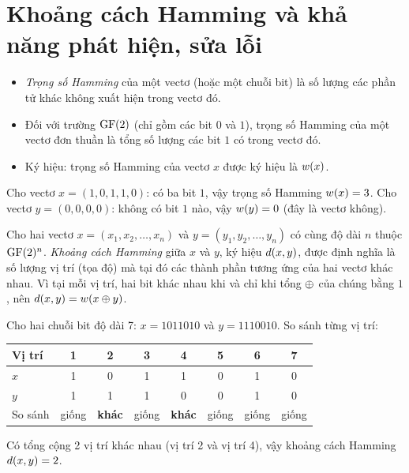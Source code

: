 \section{Khoảng cách Hamming và khả năng phát hiện, sửa lỗi}
\label{sec:1.3}

\begin{itemize}
  \item \emph{Trọng số Hamming} của một vectơ (hoặc một chuỗi bit) là số
        lượng các phần tử khác không xuất hiện trong vectơ đó.
  \item Đối với trường $\mathrm{GF}(2)$ (chỉ gồm các bit $0$ và $1$), trọng số Hamming của
        một vectơ đơn thuần là tổng số lượng các bit $1$ có trong vectơ đó.
  \item Ký hiệu: trọng số Hamming của vectơ $x$ được ký hiệu là $w(x)$.
\end{itemize}

\begin{vidu}
Cho vectơ $x = (1,0,1,1,0)$: có ba bit $1$, vậy trọng số Hamming
$w(x) = 3$. Cho vectơ $y = (0,0,0,0)$: không có bit $1$ nào, vậy
$w(y) = 0$ (đây là vectơ không).
\end{vidu}


Cho hai vectơ $x = (x_1, x_2, \dots, x_n)$ và $y = (y_1, y_2, \dots, y_n)$ có
cùng độ dài $n$ thuộc $\mathrm{GF}(2)^{n}$. \emph{Khoảng cách Hamming} giữa $x$ và $y$, ký
hiệu $d(x,y)$, được định nghĩa là số lượng vị trí (tọa độ) mà tại đó các
thành phần tương ứng của hai vectơ khác nhau. Vì tại mỗi vị trí, hai bit khác
nhau khi và chỉ khi tổng $\oplus$ của chúng bằng $1$, nên
$d(x,y) = w(x \oplus y)$.

\begin{vidu}
Cho hai chuỗi bit độ dài 7: $x = 1011010$ và $y = 1110010$. So sánh từng vị
trí:
\begin{center}\small
\begin{tabular}{|l|c|c|c|c|c|c|c|}
\hline
\textbf{Vị trí} & 1 & 2 & 3 & 4 & 5 & 6 & 7\\ \hline
$x$ & 1 & 0 & 1 & 1 & 0 & 1 & 0\\
$y$ & 1 & 1 & 1 & 0 & 0 & 1 & 0\\ \hline
So sánh & giống & \textbf{khác} & giống & \textbf{khác} & giống & giống & giống\\ \hline
\end{tabular}
\end{center}
Có tổng cộng 2 vị trí khác nhau (vị trí 2 và vị trí 4), vậy khoảng cách
Hamming $d(x,y) = 2$.
\end{vidu}

